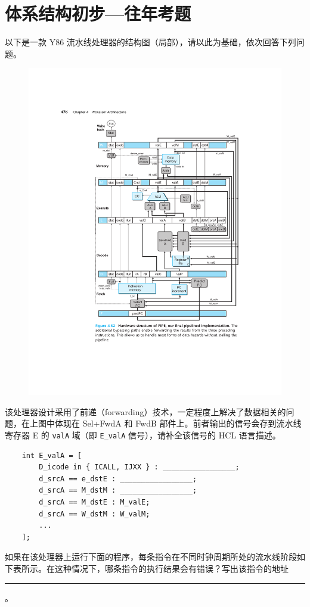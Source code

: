\chapter{体系结构初步{---}往年考题}
    \begin{problems}
         以下是一款 Y86 流水线处理器的结构图（局部），请以此为基础，依次回答下列问题。
        \begin{figure}[H]
            \centering
            \includegraphics[width=0.75\linewidth]{pipe.pdf}
        \end{figure}
            \qn 该处理器设计采用了前递（forwarding）技术，一定程度上解决了数据相关的问题，在上图中体现在 Sel+FwdA 和 FwdB 部件上。前者输出的信号会存到流水线寄存器 E 的 \verb|valA| 域（即 \verb|E_valA| 信号），请补全该信号的 HCL 语言描述。
            \begin{verbatim}
    int E_valA = [
        D_icode in { ICALL, IJXX } : _________________;
        d_srcA == e_dstE : _________________;
        d_srcA == M_dstM : _________________;
        d_srcA == M_dstE : M_valE;
        d_srcA == W_dstM : W_valM;
        ...
    ];
            \end{verbatim}
            \qn 如果在该处理器上运行下面的程序，每条指令在不同时钟周期所处的流水线阶段如下表所示。在这种情况下，哪条指令的执行结果会有错误？写出该指令的地址 \rule{2.5cm}{0.25mm}。
            \begin{table}[H]

\end{table}
\end{problems}
